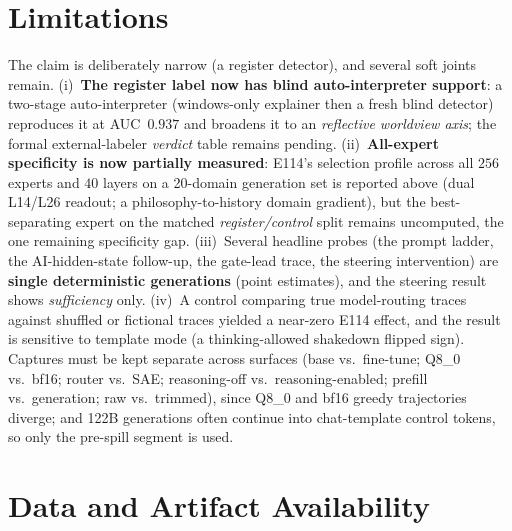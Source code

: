 \documentclass[10pt,a4paper,twocolumn]{article}
\begin{document}
\section{Limitations}\label{sec:lim}

The claim is deliberately narrow (a register detector), and several soft joints
remain. (i)~\textbf{The register label now has blind auto-interpreter support}: a
two-stage auto-interpreter (windows-only explainer then a fresh blind detector)
reproduces it at AUC~$0.937$ and broadens it to an \emph{reflective worldview
axis}; the formal external-labeler
\emph{verdict} table remains pending. (ii)~\textbf{All-expert specificity is now
partially measured}: E114's selection profile across all $256$ experts and $40$
layers on a 20-domain generation set is reported above (dual L14/L26 readout; a
philosophy-to-history domain gradient), but the best-separating expert on the
matched \emph{register/control} split remains uncomputed, the one remaining
specificity gap. (iii)~Several headline
probes (the prompt ladder, the AI-hidden-state follow-up, the gate-lead trace,
the steering intervention) are
\textbf{single deterministic generations} (point estimates), and the steering
result shows \emph{sufficiency} only. (iv)~A control comparing true model-routing
traces against shuffled or fictional traces yielded a near-zero E114 effect, and the
result is sensitive to template mode (a thinking-allowed
shakedown flipped sign). Captures must be kept separate across surfaces (base vs.\
fine-tune; Q8\_0 vs.\ bf16; router vs.\ SAE; reasoning-off vs.\
reasoning-enabled; prefill vs.\ generation; raw vs.\ trimmed), since Q8\_0 and
bf16 greedy trajectories diverge; and 122B generations often continue into
chat-template control tokens, so only the pre-spill segment is used.

\section*{Data and Artifact Availability}
\end{document}
